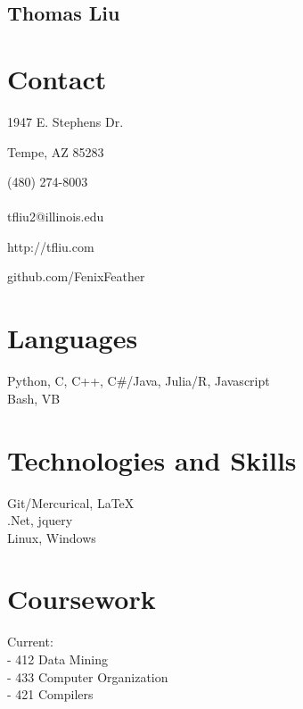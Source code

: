 \documentclass[letterpaper,10pt]{article}
\begin{document}
\pagestyle{empty}
\begin{center}\section*{ \fontsize{48}{16}\selectfont Thomas Liu}\end{center}
\begin{minipage}[t][0em][t]{0.2\textwidth}
  \section*{\bf \huge Contact}
{\small 1947 E. Stephens Dr.

Tempe, AZ 85283

(480) 274-8003\\
~\\
tfliu2@illinois.edu

http://tfliu.com

github.com/FenixFeather
}
  \section*{\huge Languages}
  \begin{flushleft}{\small
      Python, C, C++, C\#/Java, Julia/R, Javascript\\
Bash, VB\\

    }\end{flushleft}

\section*{\huge Technologies and Skills}
  \begin{flushleft}{\small
      Git/Mercurical, LaTeX\\
.Net, jquery\\
Linux, Windows
    }\end{flushleft}

\section*{\huge Coursework}
  \begin{flushleft}{\small
      Current: \\
- 412 Data Mining\\  
- 433 Computer Organization\\
- 421 Compilers\\

}
\end{flushleft}
\end{minipage}
\end{document}
